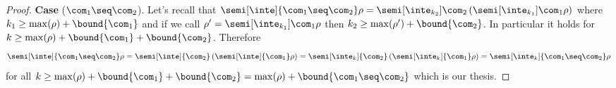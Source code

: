 \begin{proof}
  \medskip
  
  \noindent
  \textbf{Case} (\(\com_1 \seq \com_2\)).
  Let's recall that
  \(\semi[\inte]{\com_1 \seq \com_2}\rho =
  \semi[\inte_{k_2}]{\com_2}\left({\semi[\inte_{k_1}]{\com_1}\rho}\right)\)
  where \(k_1 \geq \max(\rho) + \bound{\com_1}\) and if we call
  \(\rho' = {\semi[\inte_{k_1}]{\com_1}\rho}\) then
  \({k_2 \geq \max(\rho') + \bound{\com_2}}\). In particular it holds
  for \(k \geq {\max(\rho) + \bound{\com_1} +
    \bound{\com_2}}\). Therefore
  \begin{equation*}
    \semi[\inte]{\com_1 \seq \com_2}\rho = \semi[\inte]{\com_2}\left(\semi[\inte]{\com_1}\rho\right) =
    \semi[\inte_k]{\com_2}\left(\semi[\inte_k]{\com_1}\rho\right) = \semi[\inte_k]{\com_1 \seq \com_2}\rho
  \end{equation*}
  for all
  \(k \geq \max(\rho) + \bound{\com_1} + \bound{\com_2} = \max(\rho) +
  \bound{\com_1 \seq \com_2}\) which is our thesis.

  \medskip
  

\end{proof}
